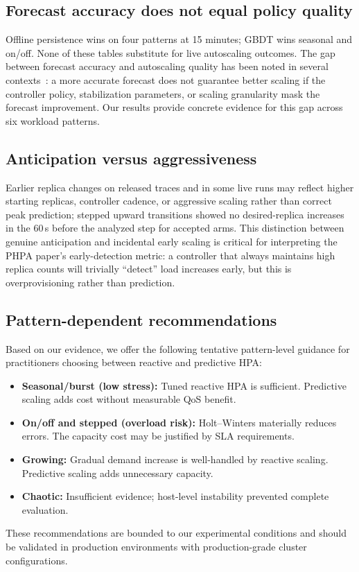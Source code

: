 \documentclass[journal]{IEEEtran}
\begin{document}
\subsection{Forecast accuracy does not equal policy quality}
Offline persistence wins on four patterns at 15 minutes; GBDT wins seasonal and on/off. None of these tables substitute for live autoscaling outcomes. The gap between forecast accuracy and autoscaling quality has been noted in several contexts~\cite{cortez2017, mca2026}: a more accurate forecast does not guarantee better scaling if the controller policy, stabilization parameters, or scaling granularity mask the forecast improvement. Our results provide concrete evidence for this gap across six workload patterns.

\subsection{Anticipation versus aggressiveness}
Earlier replica changes on released traces and in some live runs may reflect higher starting replicas, controller cadence, or aggressive scaling rather than correct peak prediction; stepped upward transitions showed no desired-replica increases in the 60\,s before the analyzed step for accepted arms. This distinction between genuine anticipation and incidental early scaling is critical for interpreting the PHPA paper's early-detection metric: a controller that always maintains high replica counts will trivially ``detect'' load increases early, but this is overprovisioning rather than prediction.

\subsection{Pattern-dependent recommendations}
Based on our evidence, we offer the following tentative pattern-level guidance for practitioners choosing between reactive and predictive HPA:
\begin{itemize}
\item \textbf{Seasonal/burst (low stress):} Tuned reactive HPA is sufficient. Predictive scaling adds cost without measurable QoS benefit.
\item \textbf{On/off and stepped (overload risk):} Holt--Winters materially reduces errors. The capacity cost may be justified by SLA requirements.
\item \textbf{Growing:} Gradual demand increase is well-handled by reactive scaling. Predictive scaling adds unnecessary capacity.
\item \textbf{Chaotic:} Insufficient evidence; host-level instability prevented complete evaluation.
\end{itemize}
These recommendations are bounded to our experimental conditions and should be validated in production environments with production-grade cluster configurations.
\end{document}
